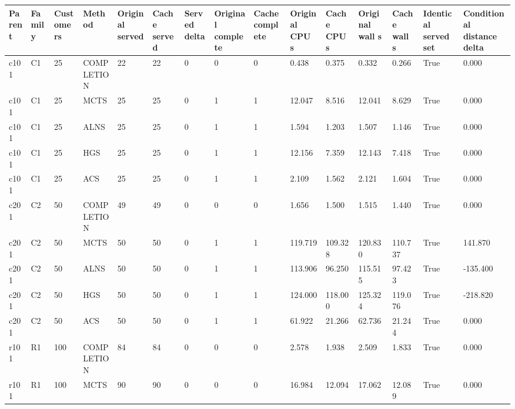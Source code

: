 \begin{tabular}{lllllllllllllll}
\hline
Parent & Family & Customers & Method & Original served & Cache served & Served delta & Original complete & Cache complete & Original CPU s & Cache CPU s & Original wall s & Cache wall s & Identical served set & Conditional distance delta \\
\hline
c101 & C1 & 25 & COMPLETION & 22 & 22 & 0 & 0 & 0 & 0.438 & 0.375 & 0.332 & 0.266 & True & 0.000 \\
c101 & C1 & 25 & MCTS & 25 & 25 & 0 & 1 & 1 & 12.047 & 8.516 & 12.041 & 8.629 & True & 0.000 \\
c101 & C1 & 25 & ALNS & 25 & 25 & 0 & 1 & 1 & 1.594 & 1.203 & 1.507 & 1.146 & True & 0.000 \\
c101 & C1 & 25 & HGS & 25 & 25 & 0 & 1 & 1 & 12.156 & 7.359 & 12.143 & 7.418 & True & 0.000 \\
c101 & C1 & 25 & ACS & 25 & 25 & 0 & 1 & 1 & 2.109 & 1.562 & 2.121 & 1.604 & True & 0.000 \\
c201 & C2 & 50 & COMPLETION & 49 & 49 & 0 & 0 & 0 & 1.656 & 1.500 & 1.515 & 1.440 & True & 0.000 \\
c201 & C2 & 50 & MCTS & 50 & 50 & 0 & 1 & 1 & 119.719 & 109.328 & 120.830 & 110.737 & True & 141.870 \\
c201 & C2 & 50 & ALNS & 50 & 50 & 0 & 1 & 1 & 113.906 & 96.250 & 115.515 & 97.423 & True & -135.400 \\
c201 & C2 & 50 & HGS & 50 & 50 & 0 & 1 & 1 & 124.000 & 118.000 & 125.324 & 119.076 & True & -218.820 \\
c201 & C2 & 50 & ACS & 50 & 50 & 0 & 1 & 1 & 61.922 & 21.266 & 62.736 & 21.244 & True & 0.000 \\
r101 & R1 & 100 & COMPLETION & 84 & 84 & 0 & 0 & 0 & 2.578 & 1.938 & 2.509 & 1.833 & True & 0.000 \\
r101 & R1 & 100 & MCTS & 90 & 90 & 0 & 0 & 0 & 16.984 & 12.094 & 17.062 & 12.089 & True & 0.000 \\

\end{tabular}
